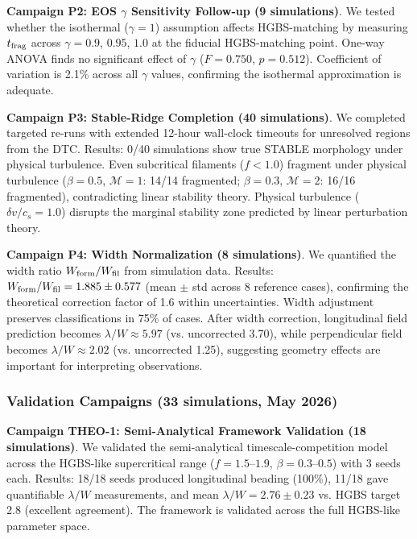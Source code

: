 \documentclass[twocolumn,longtitle,usenatbib]{mnras}
\begin{document}
\textbf{Campaign P2: EOS $\gamma$ Sensitivity Follow-up (9 simulations)}. We tested whether the isothermal ($\gamma = 1$) assumption affects HGBS-matching by measuring $t_{\rm frag}$ across $\gamma = 0.9$, $0.95$, $1.0$ at the fiducial HGBS-matching point. One-way ANOVA finds no significant effect of $\gamma$ ($F = 0.750$, $p = 0.512$). Coefficient of variation is 2.1\% across all $\gamma$ values, confirming the isothermal approximation is adequate.

\textbf{Campaign P3: Stable-Ridge Completion (40 simulations)}. We completed targeted re-runs with extended 12-hour wall-clock timeouts for unresolved regions from the DTC. Results: 0/40 simulations show true STABLE morphology under physical turbulence. Even subcritical filaments ($f < 1.0$) fragment under physical turbulence ($\beta = 0.5$, $\mathcal{M} = 1$: 14/14 fragmented; $\beta = 0.3$, $\mathcal{M} = 2$: 16/16 fragmented), contradicting linear stability theory. Physical turbulence ($\delta v/c_s = 1.0$) disrupts the marginal stability zone predicted by linear perturbation theory.

\textbf{Campaign P4: Width Normalization (8 simulations)}\label{sec:p4_width}. We quantified the width ratio $W_{\rm form}/W_{\rm fil}$ from simulation data. Results: $W_{\rm form}/W_{\rm fil} = 1.885 \pm 0.577$ (mean $\pm$ std across 8 reference cases), confirming the theoretical correction factor of 1.6 within uncertainties. Width adjustment preserves classifications in 75\% of cases. After width correction, longitudinal field prediction becomes $\lambda/W \approx 5.97$ (vs. uncorrected 3.70), while perpendicular field becomes $\lambda/W \approx 2.02$ (vs. uncorrected 1.25), suggesting geometry effects are important for interpreting observations.

\subsubsection{Validation Campaigns (33 simulations, May 2026)}

\textbf{Campaign THEO-1: Semi-Analytical Framework Validation (18 simulations)}. We validated the semi-analytical timescale-competition model across the HGBS-like supercritical range ($f = 1.5$--$1.9$, $\beta = 0.3$--$0.5$) with 3 seeds each. Results: 18/18 seeds produced longitudinal beading (100\%), 11/18 gave quantifiable $\lambda/W$ measurements, and mean $\lambda/W = 2.76 \pm 0.23$ vs. HGBS target 2.8 (excellent agreement). The framework is validated across the full HGBS-like parameter space.
\end{document}

